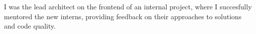 
I was the lead architect on the frontend of an internal project, where I succesfully mentored
the new interns, providing feedback on their approaches to solutions and code quality.
